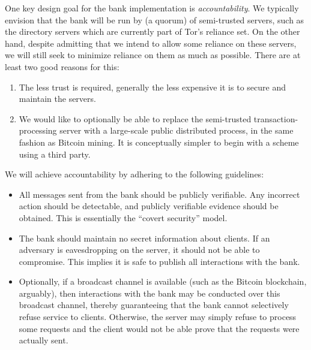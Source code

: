 One key design goal for the bank implementation is \emph{accountability}.
We typically envision that the bank will be run by (a quorum) of semi-trusted servers, such as the directory servers which are currently part of Tor’s reliance set. On the other hand, despite admitting that we intend to allow some reliance on these servers, we will still seek to minimize reliance on them as much as possible. 
There are at least two good reasons for this:
\begin{enumerate}
\item The less trust is required, generally the less expensive it is to secure and maintain the servers.
\item We would like to optionally be able to replace the semi-trusted transaction-processing server with a large-scale public distributed process, in the same fashion as Bitcoin mining. 
It is conceptually simpler to begin with a scheme using a third party.
\end{enumerate}

We will achieve accountability by adhering to the following guidelines:
\begin{itemize}
\item All messages sent from the bank should be publicly verifiable. Any incorrect action should be detectable, and publicly verifiable evidence should be obtained. 
This is essentially the “covert security” model\citeme.
\item The bank should maintain no secret information about clients. 
If an adversary is eavesdropping on the server, it should not be able to compromise. 
This implies it is safe to publish all interactions with the bank.
\item Optionally, if a broadcast channel is available (such as the Bitcoin blockchain, arguably), then interactions with the bank may be conducted over this broadcast channel, thereby guaranteeing that the bank cannot selectively refuse service to clients. 
Otherwise, the server may simply refuse to process some requests and the client would not be able prove that the requests were actually sent.
\end{itemize}

